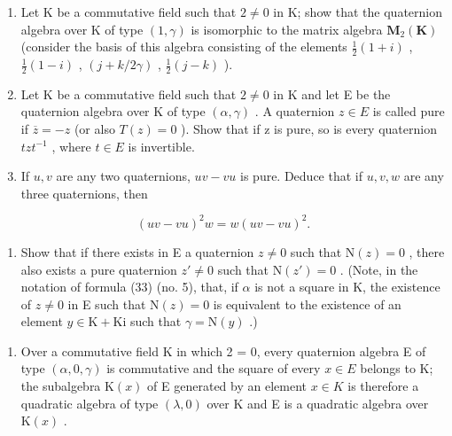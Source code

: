 \begin{enumerate}
\def\labelenumi{(\alph{enumi})}
\setcounter{enumi}{1}
\item
  Let K be a commutative field such that \(2 \neq 0\) in K; show that the quaternion algebra over K of type \((1, \gamma)\) is isomorphic to the matrix algebra \(\mathbf{M}_{2}(\mathbf{K})\) (consider the basis of this algebra consisting of the elements \(\frac{1}{2}(1 + i)\) , \(\frac{1}{2}(1 - i)\) , \((j + k/2\gamma)\) , \(\frac{1}{2}(j - k)\) ).
\item
  Let K be a commutative field such that \(2 \neq 0\) in K and let E be the quaternion algebra over K of type \((\alpha, \gamma)\) . A quaternion \(z \in E\) is called pure if \(\overline{z} = -z\) (or also \(T(z) = 0\) ). Show that if z is pure, so is every quaternion \(tzt^{-1}\) , where \(t \in E\) is invertible.
\item
  If \(u, v\) are any two quaternions, \(uv - vu\) is pure. Deduce that if \(u, v, w\) are any three quaternions, then
\end{enumerate}

\[
(u v - v u) ^ {2} w = w (u v - v u) ^ {2}.
\]

\begin{enumerate}
\def\labelenumi{(\alph{enumi})}
\setcounter{enumi}{4}
\tightlist
\item
  Show that if there exists in E a quaternion \(z \neq 0\) such that \(\mathrm{N}(z) = 0\) , there also exists a pure quaternion \(z' \neq 0\) such that \(\mathrm{N}(z') = 0\) . (Note, in the notation of formula (33) (no. 5), that, if \(\alpha\) is not a square in K, the existence of \(z \neq 0\) in E such that \(\mathrm{N}(z) = 0\) is equivalent to the existence of an element \(y \in \mathrm{K} + \mathrm{Ki}\) such that \(\gamma = \mathrm{N}(y)\) .)
\end{enumerate}

\begin{enumerate}
\def\labelenumi{\arabic{enumi}.}
\setcounter{enumi}{4}
\tightlist
\item
  Over a commutative field K in which 2 = 0, every quaternion algebra E of type \((\alpha, 0, \gamma)\) is commutative and the square of every \(x \in E\) belongs to K; the subalgebra \(\mathrm{K}(x)\) of E generated by an element \(x \in K\) is therefore a quadratic algebra of type \((\lambda, 0)\) over K and E is a quadratic algebra over \(\mathrm{K}(x)\) .
\end{enumerate}

